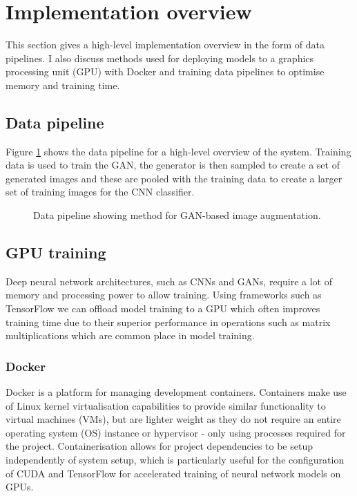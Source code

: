 \documentclass[
    author={Kai Hulme},
    supervisor={Dr Jon Bird},
    degree={BSc},
    title={Generative Adversarial Networks as an Augmentation Technique},
    subtitle={for Alzheimer's Disease Detection in MRI Volumes},
    type={Research},
    year={2021} 
]{dissertation}
\begin{document}
\section{Implementation overview}

This section gives a high-level implementation overview in the form of data pipelines. I also discuss methods used for deploying models to a graphics processing unit (GPU) with Docker and training data pipelines to optimise memory and training time.

\subsection{Data pipeline}

Figure \ref{data_pipeline} shows the data pipeline for a high-level overview of the system. Training data is used to train the GAN, the generator is then sampled to create a set of generated images and these are pooled with the training data to create a larger set of training images for the CNN classifier.

\begin{figure}[t]
    \label{data_pipeline}
    \centering
    \caption{Data pipeline showing method for GAN-based image augmentation.}
\end{figure}

\subsection{GPU training}
\label{gpu_training}

Deep neural network architectures, such as CNNs and GANs, require a lot of memory and processing power to allow training. Using frameworks such as TensorFlow we can offload model training to a GPU which often improves training time due to their superior performance in operations such as matrix multiplications which are common place in model training.

\subsubsection{Docker}

Docker is a platform for managing development containers. Containers make use of Linux kernel virtualisation capabilities to provide similar functionality to virtual machines (VMs), but are lighter weight as they do not require an entire operating system (OS) instance or hypervisor - only using processes required for the project. Containerisation allows for project dependencies to be setup independently of system setup, which is particularly useful for the configuration of CUDA and TensorFlow for accelerated training of neural network models on GPUs. \\
\end{document}
